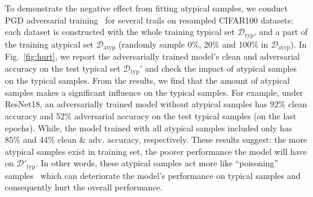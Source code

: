 To demonstrate the negative effect from fitting atypical samples, we conduct PGD adversarial training~\cite{madry2017towards} for several trails on resampled CIFAR100 datasets: each dataset is constructed with the whole training typical set $\mathcal{D}_\text{typ}$, and a part of the training atypical set $\mathcal{D}_\text{atyp}$ (randomly sample 0\%, 20\% and 100\% in $\mathcal{D}_\text{atyp}$). In Fig.~\ref{fig:hurt}, we report the adversarially trained model's clean and adversarial accuracy on the test typical set $\mathcal{D}_\text{typ}'$ and check the impact of atypical samples on the typical samples. From the results, we find that the amount of atypical samples makes a significant influence on the typical samples. For example, under ResNet18, an adversarially trained model without atypical samples has 92\% clean accuracy and 52\% adversarial accuracy on the test typical samples (on the last epochs). While, the model trained with all atypical samples included only has 85\% and 44\% clean \& adv. accuracy, respectively. 
These results suggest: the more atypical samples exist in training set, the poorer performance the model will have on $\mathcal{D}'_\text{typ}$. In other words, these atypical samples act more like ``poisoning'' samples~\cite{biggio2012poisoning, xu2019adversarial} which can deteriorate the model's performance on typical samples and consequently hurt the overall performance. 


